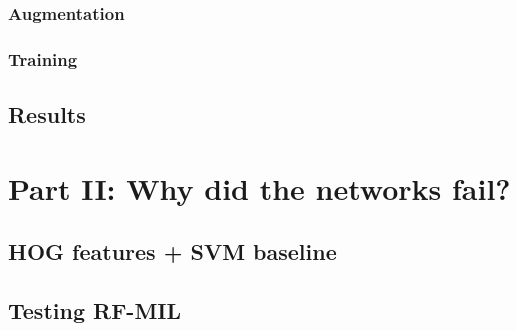 \documentclass[twocolumn,10pt]{article}
\begin{document}
\subsubsection{Augmentation}

\subsubsection{Training}

\subsection{Results}

\section{Part II: Why did the networks fail?}
\subsection{HOG features + SVM baseline}
\subsection{Testing RF-MIL}


\end{document}
